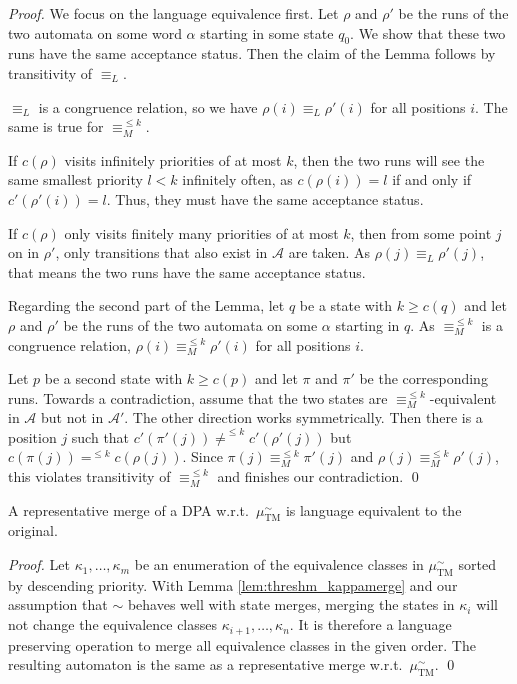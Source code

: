 \begin{proof}
	We focus on the language equivalence first. Let $\rho$ and $\rho'$ be the runs of the two automata on some word $\alpha$ starting in some state $q_0$. We show that these two runs have the same acceptance status. Then the claim of the Lemma follows by transitivity of $\equiv_L$.
	
	$\equiv_L$ is a congruence relation, so we have $\rho(i) \equiv_L \rho'(i)$ for all positions $i$. The same is true for $\equiv_M^{\leq k}$.
	
	If $c(\rho)$ visits infinitely priorities of at most $k$, then the two runs will see the same smallest priority $l < k$ infinitely often, as $c(\rho(i)) = l$ if and only if $c'(\rho'(i)) = l$. Thus, they must have the same acceptance status.
	
	If $c(\rho)$ only visits finitely many priorities of at most $k$, then from some point $j$ on in $\rho'$, only transitions that also exist in $\mathcal{A}$ are taken. As $\rho(j) \equiv_L \rho'(j)$, that means the two runs have the same acceptance status.
	
	\vspace{5pt}
	
	Regarding the second part of the Lemma, let $q$ be a state with $k \geq c(q)$ and let $\rho$ and $\rho'$ be the runs of the two automata on some $\alpha$ starting in $q$. As $\equiv_M^{\leq k}$ is a congruence relation, $\rho(i) \equiv_M^{\leq k} \rho'(i)$ for all positions $i$. 
	
	Let $p$ be a second state with $k \geq c(p)$ and let $\pi$ and $\pi'$ be the corresponding runs. Towards a contradiction, assume that the two states are $\equiv_M^{\leq k}$-equivalent in $\mathcal{A}$ but not in $\mathcal{A}'$. The other direction works symmetrically. Then there is a position $j$ such that $c'(\pi'(j)) \neq^{\leq k} c'(\rho'(j))$ but $c(\pi(j)) =^{\leq k} c(\rho(j))$. Since $\pi(j) \equiv_M^{\leq k} \pi'(j)$ and $\rho(j) \equiv_M^{\leq k} \rho'(j)$, this violates transitivity of $\equiv_M^{\leq k}$ and finishes our contradiction. \qed
\end{proof}

\begin{theorem}
	A representative merge of a DPA w.r.t.\ $\mu_\text{TM}^\sim$ is language equivalent to the original.
\end{theorem}

\begin{proof}
	Let $\kappa_1, \dots, \kappa_m$ be an enumeration of the equivalence classes in $\mu_\text{TM}^\sim$ sorted by descending priority. With Lemma \ref{lem:threshm_kappamerge} and our assumption that $\sim$ behaves well with state merges, merging the states in $\kappa_i$ will not change the equivalence classes $\kappa_{i+1}, \dots, \kappa_n$. It is therefore a language preserving operation to merge all equivalence classes in the given order. The resulting automaton is the same as a representative merge w.r.t.\ $\mu_\text{TM}^\sim$. \qed
\end{proof}


